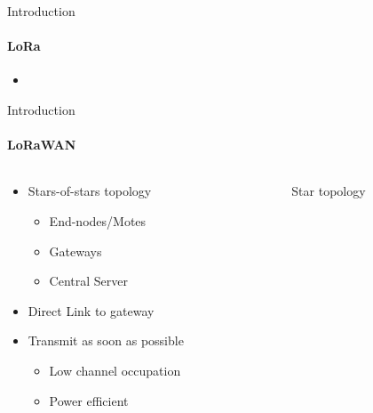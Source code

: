 \begin{frame}{Introduction}
\framesubtitle{LoRa}
\begin{itemize}
  \item 
\end{itemize}
\end{frame}

\begin{frame}{Introduction}
\framesubtitle{LoRaWAN}
\begin{columns}
\begin{column}{0.5\textwidth}
\begin{itemize}
    \item Stars-of-stars topology
    \begin{itemize}
      \item End-nodes/Motes
      \item Gateways
      \item Central Server
    \end{itemize}
    \item Direct Link to gateway
    \item Transmit as soon as possible
    \begin{itemize}
      \item Low channel occupation
      \item Power efficient
    \end{itemize}
\end{itemize}
\end{column}
\begin{column}{0.5\textwidth}
\begin{figure}[H]
    \centering
    \caption{Star topology\label{fig:startopology}}
\end{figure}
\end{column}
\end{columns}
\end{frame}


